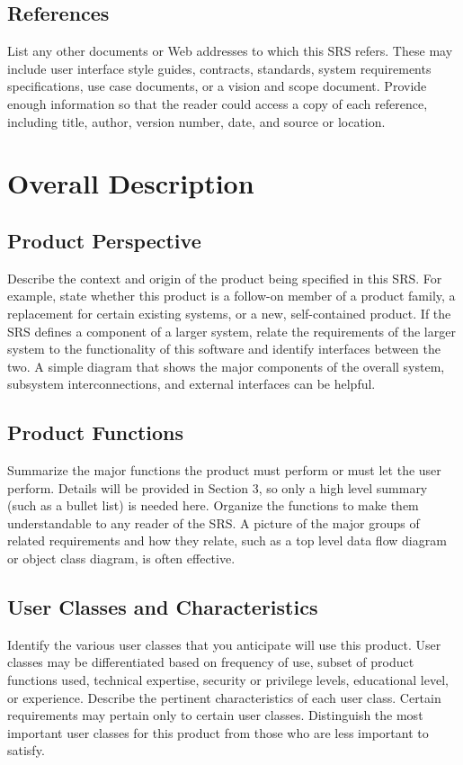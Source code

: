 \subsection*{References}
List any other documents or Web addresses to which this SRS refers. These may include user interface style guides, contracts, standards, system requirements specifications, use case documents, or a vision and scope document. Provide enough information so that the reader could access a copy of each reference, including title, author, version number, date, and source or location.


\section{Overall Description}
\subsection*{Product Perspective}
Describe the context and origin of the product being specified in this SRS. For example, state whether this product is a follow-on member of a product family, a replacement for certain existing systems, or a new, self-contained product. If the SRS defines a component of a larger system, relate the requirements of the larger system to the functionality of this software and identify interfaces between the two. A simple diagram that shows the major components of the overall system, subsystem interconnections, and external interfaces can be helpful.

\subsection*{Product Functions}
Summarize the major functions the product must perform or must let the user perform. Details will be provided in Section 3, so only a high level summary (such as a bullet list) is needed here. Organize the functions to make them understandable to any reader of the SRS. A picture of the major groups of related requirements and how they relate, such as a top level data flow diagram or object class diagram, is often effective.

\subsection*{User Classes and Characteristics}
Identify the various user classes that you anticipate will use this product. User classes may be differentiated based on frequency of use, subset of product functions used, technical expertise, security or privilege levels, educational level, or experience. Describe the pertinent characteristics of each user class. Certain requirements may pertain only to certain user classes. Distinguish the most important user classes for this product from those who are less important to satisfy.

